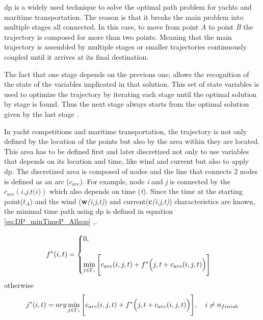 \acrshort{dp} is a widely used technique to solve the optimal path problem for yachts and maritime transportation. The reason is that it breaks the main problem into multiple stages all connected. In this case, to move from point \textit{A} to point \textit{B} the trajectory is composed for more than two points. Meaning that the main trajectory is assembled by multiple stages or smaller trajectories continuously coupled until it arrives at its final destination. \par \noindent 
The fact that one stage depends on the previous one, allows the recognition of the state of the variables implicated in that solution. This set of state variables is used to optimize the trajectory by iterating each stage until the optimal solution by stage is found. Thus the next stage always starts from the optimal solution given by the last stage \cite{philpott2001optimising}. \par

In yacht competitions and maritime transportation, the trajectory is not only defined by the location of the points but also by the area within they are located. This area has to be defined first and later discretized not only to use variables that depends on its location and time, like wind and current but also to apply \acrshort{dp}. The discretized area is composed of nodes and the line that connects 2 nodes is defined as an arc ($c_{arc}$). For example, node \textit{i} and \textit{j} is connected by the $c_{arc}(\textit{i,j,t(i)})$ which also depends on time (\textit{t}). Since the time at the starting point(\textit{$t_{A}$}) and the wind (\textbf{w}\textit{(i,j,t)}) and current(\textbf{c}\textit{(i,j,t)}) characteristics are known, the minimal time path using \acrshort{dp} is defined in equation \ref{eq:DP_minTimeP_Allsop}  \cite{zyczkowski2017method},\cite{allsopp2000optimal}.

\begin{equation} \label{eq:DP_minTimeP_Allsop}
f^*(i,t)=
\begin{cases}
0,  &  \\
\\
\noindent 
\displaystyle
\min_{j \in \Gamma_{i}} \Bigg[c_{arc}(i,j,t)+f^*\Big(j,t + c_{arc}(i,j,t)\Big) \Bigg]\\
\end{cases}
\end{equation}
\hspace{20mm} otherwise
\begin{equation}
j^*(i,t)=
\noindent 
\displaystyle
arg \min_{j \in \Gamma_{i}} \Bigg[ c_{arc}(i,j,t)+f^*\Big(j,t + c_{arc}(i,j,t)\Big) \Bigg], \quad i \neq n_{finish} 
\end{equation}

